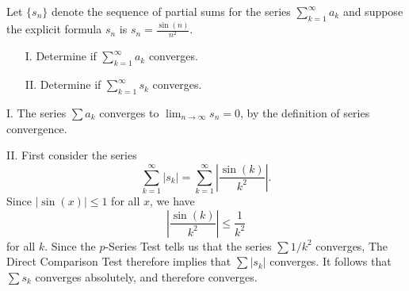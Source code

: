 \documentclass[]{ximera}
\begin{document}
\begin{problem}
Let $\{s_n\}$ denote the sequence of partial sums for the series $\sum_{k=1}^\infty a_k$ and suppose the explicit formula $s_n$ is $s_n = \frac{\sin(n)}{n^2}.$
\begin{itemize}
\item[I.] Determine if $\sum_{k=1}^{\infty} a_k$ converges.
\item[II.] Determine if $\sum_{k=1}^{\infty} s_k$ converges.
\end{itemize}

\begin{solution}
I. The series $\sum a_k$ converges to $\lim_{n\rightarrow \infty} s_n = 0$, by the definition of series convergence.

II. First consider the series 
$$
\sum_{k=1}^{\infty} |s_k| = \sum_{k=1}^{\infty} \left|\frac{\sin(k)}{k^2} \right|.
$$
Since $|\sin(x)| \leq 1$ for all $x$, we have 
$$
\left|\frac{\sin(k)}{k^2} \right| \leq \frac{1}{k^2}
$$
for all $k$. Since the $p$-Series Test tells us that the series $\sum 1/k^2$ converges, The Direct Comparison Test therefore implies that $\sum |s_k|$ converges. It follows that $\sum s_k$ converges absolutely, and therefore converges.
\end{solution}
\end{problem}
\end{document}

